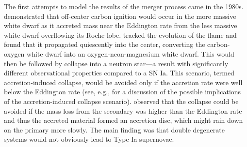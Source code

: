 \documentclass[iop]{../emulateapj}
\begin{document}
The first attempts to model the results of the merger process came in the
1980s. \cite{nomotoiben:1985} demonstrated that off-center carbon
ignition would occur in the more massive white dwarf as it accreted
mass near the Eddington rate from the less massive white dwarf
overflowing its Roche lobe. \cite{saionomoto:1985} tracked the
evolution of the flame and found that it propagated quiescently into
the center, converting the carbon-oxygen white dwarf into an
oxygen-neon-magnesium white dwarf. This would then be followed by
collapse into a neutron star---a result with significantly different
observational properties compared to a SN Ia. This scenario, termed
accretion-induced collapse, would be avoided only if the accretion
rate were well below the Eddington rate (see, e.g., \cite{fryer:1999}
for a discussion of the possible implications of the accretion-induced 
collapse scenario). \cite{tutukov_yungelson:1979}
observed that the collapse could be avoided if the mass loss from the secondary
was higher than the Eddington rate and thus the accreted material
formed an accretion disc, which might rain down on the primary more
slowly. The main finding was that double degenerate systems would not
obviously lead to Type Ia supernovae.
\end{document}

